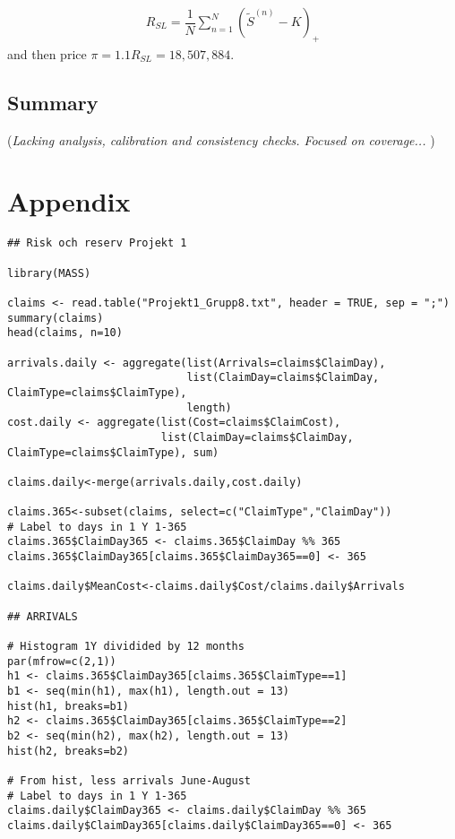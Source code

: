 \documentclass[11pt]{article}
\begin{document}
\begin{align} \label{eqsl1}
	R_{SL} = \dfrac{1}{N}\sum_{n=1}^N\left(	 \tilde{S}^{(n)}-K\right)_+        
\end{align}
and then price $\pi = 1.1R_{SL} = 18,507,884$.

\subsection*{Summary}
({\it Lacking analysis, calibration and consistency checks. Focused on coverage... })



\section*{Appendix}

\begin{verbatim}
## Risk och reserv Projekt 1

library(MASS)

claims <- read.table("Projekt1_Grupp8.txt", header = TRUE, sep = ";")
summary(claims)
head(claims, n=10)

arrivals.daily <- aggregate(list(Arrivals=claims$ClaimDay),
                            list(ClaimDay=claims$ClaimDay, ClaimType=claims$ClaimType),
                            length)
cost.daily <- aggregate(list(Cost=claims$ClaimCost),
                        list(ClaimDay=claims$ClaimDay, ClaimType=claims$ClaimType), sum)

claims.daily<-merge(arrivals.daily,cost.daily)

claims.365<-subset(claims, select=c("ClaimType","ClaimDay"))
# Label to days in 1 Y 1-365
claims.365$ClaimDay365 <- claims.365$ClaimDay %% 365
claims.365$ClaimDay365[claims.365$ClaimDay365==0] <- 365

claims.daily$MeanCost<-claims.daily$Cost/claims.daily$Arrivals

## ARRIVALS

# Histogram 1Y dividided by 12 months
par(mfrow=c(2,1))
h1 <- claims.365$ClaimDay365[claims.365$ClaimType==1]
b1 <- seq(min(h1), max(h1), length.out = 13)
hist(h1, breaks=b1)
h2 <- claims.365$ClaimDay365[claims.365$ClaimType==2]
b2 <- seq(min(h2), max(h2), length.out = 13)
hist(h2, breaks=b2)

# From hist, less arrivals June-August
# Label to days in 1 Y 1-365
claims.daily$ClaimDay365 <- claims.daily$ClaimDay %% 365
claims.daily$ClaimDay365[claims.daily$ClaimDay365==0] <- 365


\end{verbatim}
\end{document}
